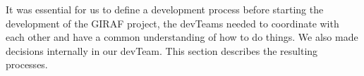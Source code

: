 It was essential for us to define a development process before starting the development of the GIRAF project, the \glspl{devTeam} needed to coordinate with each other and have a common understanding of how to do  things. We also made decisions internally in our \gls{devTeam}. This section describes the resulting processes. 
